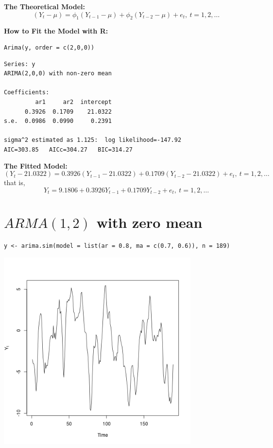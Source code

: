\documentclass[12pt]{article}
\begin{document}
\noindent
\textbf{The Theoretical Model:} 
\[
(Y_{t} - \mu) = \phi_{1}(Y_{t - 1} - \mu) + \phi_{2}(Y_{t - 2} - \mu) + e_{t},\ t = 1,2,\ldots
\]

\noindent
\textbf{How to Fit the Model with R:}


\begin{verbatim}
Arima(y, order = c(2,0,0))
\end{verbatim}




\begin{verbatim}
Series: y 
ARIMA(2,0,0) with non-zero mean 

Coefficients:
         ar1     ar2  intercept
      0.3926  0.1709    21.0322
s.e.  0.0986  0.0990     0.2391

sigma^2 estimated as 1.125:  log likelihood=-147.92
AIC=303.85   AICc=304.27   BIC=314.27
\end{verbatim}

\noindent
\textbf{The Fitted Model:} 
\[
(Y_{t} -  21.0322 ) =  0.3926 (Y_{t - 1} -  21.0322 ) +  0.1709 (Y_{t - 2} -  21.0322 ) + e_{t},\ t = 1,2,\ldots
\]
that is,
\[
Y_{t} =   9.1806 +  0.3926 Y_{t - 1} +  0.1709 Y_{t - 2} + e_{t},\ t = 1,2,\ldots
\]
\section*{$ARMA(1,2)$ with zero mean}
\label{sec-5}


\begin{verbatim}
y <- arima.sim(model = list(ar = 0.8, ma = c(0.7, 0.6)), n = 189)
\end{verbatim}





\includegraphics[width=4.0in]{img/arma12zm.png}
\end{document}
